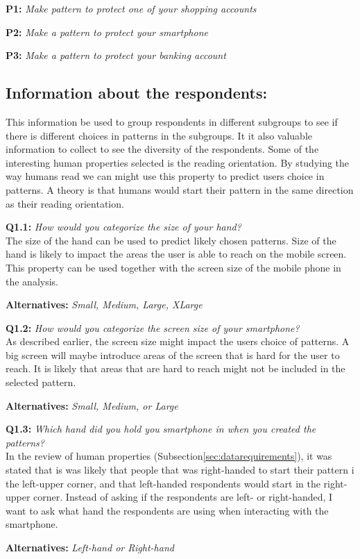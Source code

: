       {\bf P1:} {\it Make pattern to protect one of your shopping accounts}

      {\bf P2:} {\it Make a pattern to protect your smartphone}

      {\bf P3:} {\it Make a pattern to protect your banking account}

    \subsection*{Information about the respondents:} 
    This information be used to group respondents in different subgroups to see if there is different choices in patterns in the subgroups. It it also valuable information to collect to see the diversity of the respondents. Some of the interesting human properties selected is the reading orientation. By studying the way humans read we can might use this property to predict users choice in patterns. A theory is that humans would start their pattern in the same direction as their reading orientation. 

      {\bf Q1.1:} {\it How would you categorize the size of your hand?} \\
      The size of the hand can be used to predict likely chosen patterns. Size of the hand is likely to impact the areas the user is able to reach on the mobile screen. This property can be used together with the screen size of the mobile phone in the analysis. 
        \begin{enumerate*}
          \item[ ] {\bf Alternatives:} {\it Small, Medium, Large, XLarge}
        \end{enumerate*}

      {\bf Q1.2:} {\it How would you categorize the screen size of your smartphone?} \\
      As described earlier, the screen size might impact the users choice of patterns. A big screen will maybe introduce areas of the screen that is hard for the user to reach. It is likely that areas that are hard to reach might not be included in the selected pattern.
        \begin{enumerate*}
          \item[ ] {\bf Alternatives:} {\it Small, Medium, or Large}
        \end{enumerate*}

      {\bf Q1.3:} {\it Which hand did you hold you smartphone in when you created the patterns?} \\
      In the review of human properties (Subsection\ref{sec:datarequirements}), it was stated that is was likely that people that was right-handed to start their pattern i the left-upper corner, and that left-handed respondents would start in the right-upper corner. Instead of asking if the respondents are left- or right-handed, I want to ask what hand the respondents are using when interacting with the smartphone. 
        \begin{enumerate*}
          \item[ ] {\bf Alternatives:} {\it Left-hand or Right-hand}
        \end{enumerate*}

